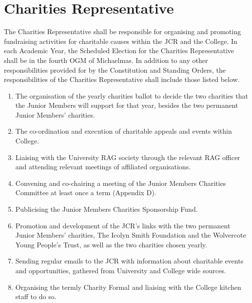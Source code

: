 \section{Charities Representative}
\npara The Charities Representative shall be responsible for organising and promoting fundraising activities for charitable causes within the JCR and the College.
\npara In each Academic Year, the Scheduled Election for the Charities Representative shall be in the fourth OGM of Michaelmas.
\npara In addition to any other responsibilities provided for by the Constitution and Standing Orders, the responsibilities of the Charities Representative shall include those listed below.
\begin{enumerate}
	\item The organisation of the yearly charities ballot to decide the two charities that the Junior Members will support for that year, besides the two permanent Junior Members' charities.
	\item The co-ordination and execution of charitable appeals and events within College.
	\item Liaising with the University RAG society through the relevant RAG officer and attending relevant meetings of affiliated organisations.
	\item Convening and co-chairing a meeting of the Junior Members Charities Committee at least once a term (Appendix D).
	\item Publicising the Junior Members Charities Sponsorship Fund.
	\item Promotion and development of the JCR's links with the two permanent Junior Members' charities, The Icolyn Smith Foundation and the Wolvercote Young People's Trust, as well as the two charities chosen yearly.     
	\item Sending regular emails to the JCR with information about charitable events and opportunities, gathered from University and College wide sources.
	\item Organising the termly Charity Formal and liaising with the College kitchen staff to do so.
\end{enumerate}
